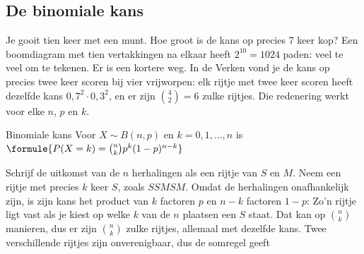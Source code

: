
\begin{oefeningen}
\end{oefeningen}

\subsection{De binomiale kans}

Je gooit tien keer met een munt. Hoe groot is de kans op precies 7 keer kop? Een boomdiagram met tien vertakkingen na elkaar heeft $2^{10} = 1024$ paden: veel te veel om te tekenen. Er is een kortere weg. In de Verken vond je de kans op precies twee keer scoren bij vier vrijworpen: elk rijtje met twee keer scoren heeft dezelfde kans $0{,}7^2 \cdot 0{,}3^2$, en er zijn $\binom42 = 6$ zulke rijtjes. Die redenering werkt voor elke $n$, $p$ en $k$.

\begin{theorie}
\begin{stelling}{Binomiale kans}
Voor $X \sim B(n, p)$ en $k = 0, 1, \ldots, n$ is \quad $\formule{P(X = k) = \binom{n}{k} p^k (1 - p)^{n - k}}$
\end{stelling}

\begin{bewijs}
Schrijf de uitkomst van de $n$ herhalingen als een rijtje van $S$ en $M$. Neem een rijtje met precies $k$ keer $S$, zoals $SS\!M\!S\!M$. Omdat de herhalingen onafhankelijk zijn, is zijn kans het product van $k$ factoren $p$ en $n - k$ factoren $1 - p$:
Zo'n rijtje ligt vast als je kiest op welke $k$ van de $n$ plaatsen een $S$ staat. Dat kan op $\binom{n}{k}$ manieren, dus er zijn $\binom{n}{k}$ zulke rijtjes, allemaal met dezelfde kans. Twee verschillende rijtjes zijn onverenigbaar, dus de somregel geeft
\end{bewijs}
\end{theorie}

